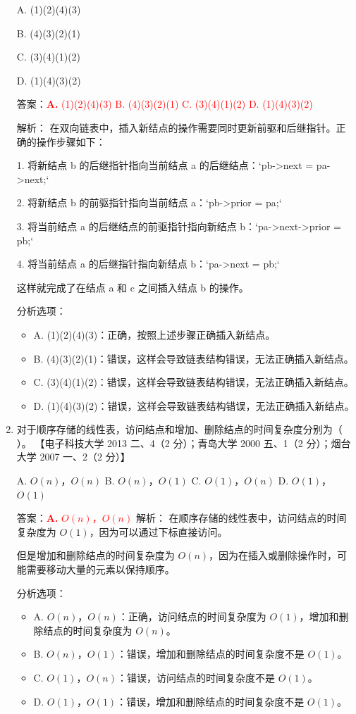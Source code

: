 \documentclass[lang=cn,newtx,10pt,scheme=chinese]{../../../elegantbook}
\begin{document}
\begin{enumerate}
        A. (1)(2)(4)(3)
    
        B. (4)(3)(2)(1)  
    
        C. (3)(4)(1)(2)  
    
        D. (1)(4)(3)(2)  

        答案：\textcolor{red}{\textbf{A.} (1)(2)(4)(3) \quad B. (4)(3)(2)(1) \quad C. (3)(4)(1)(2) \quad D. (1)(4)(3)(2)}

        解析：
        在双向链表中，插入新结点的操作需要同时更新前驱和后继指针。正确的操作步骤如下：

        1. 将新结点 b 的后继指针指向当前结点 a 的后继结点：`pb->next = pa->next;`

        2. 将新结点 b 的前驱指针指向当前结点 a：`pb->prior = pa;`

        3. 将当前结点 a 的后继结点的前驱指针指向新结点 b：`pa->next->prior = pb;`

        4. 将当前结点 a 的后继指针指向新结点 b：`pa->next = pb;`

        这样就完成了在结点 a 和 c 之间插入结点 b 的操作。

        分析选项：
        \begin{itemize}
            \item A. (1)(2)(4)(3)：正确，按照上述步骤正确插入新结点。
            \item B. (4)(3)(2)(1)：错误，这样会导致链表结构错误，无法正确插入新结点。
            \item C. (3)(4)(1)(2)：错误，这样会导致链表结构错误，无法正确插入新结点。
            \item D. (1)(4)(3)(2)：错误，这样会导致链表结构错误，无法正确插入新结点。
        \end{itemize}
        \item 对于顺序存储的线性表，访问结点和增加、删除结点的时间复杂度分别为（ ）。  
        【电子科技大学 2013 二、4（2 分）；青岛大学 2000 五、1（2 分）；烟台大学 2007 一、2（2 分）】  
       
        A. $O(n)$，$O(n)$ \quad B. $O(n)$，$O(1)$ \quad C. $O(1)$，$O(n)$ \quad D. $O(1)$，$O(1)$  

        答案：\textcolor{red}{\textbf{A.} $O(n)$，$O(n)$}
        解析：
        在顺序存储的线性表中，访问结点的时间复杂度为 $O(1)$，因为可以通过下标直接访问。

        但是增加和删除结点的时间复杂度为 $O(n)$，因为在插入或删除操作时，可能需要移动大量的元素以保持顺序。

        分析选项：
        \begin{itemize}
            \item A. $O(n)$，$O(n)$：正确，访问结点的时间复杂度为 $O(1)$，增加和删除结点的时间复杂度为 $O(n)$。
            \item B. $O(n)$，$O(1)$：错误，增加和删除结点的时间复杂度不是 $O(1)$。
            \item C. $O(1)$，$O(n)$：错误，访问结点的时间复杂度不是 $O(1)$。
            \item D. $O(1)$，$O(1)$：错误，增加和删除结点的时间复杂度不是 $O(1)$。
        \end{itemize}
    

\end{enumerate}
\end{document}
